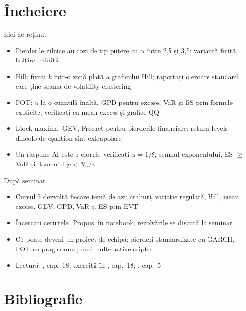 \section{Încheiere}

\begin{frame}{Idei de reținut}
\itemsize{\small}
\begin{itemize}
    \item Pierderile zilnice au cozi de tip putere cu $\alpha$ între 2,5 și 3,5: varianță finită, boltire infinită
    \item Hill: fixați $k$ într-o zonă plată a graficului Hill; raportați o eroare standard care ține seama de volatility clustering
    \item POT: $u$ la o cuantilă înaltă, GPD pentru excese, VaR și ES prin formule explicite; verificați cu mean excess și grafice QQ
    \item Block maxima: GEV, Fréchet pentru pierderile financiare; return levels dincolo de eșantion sînt extrapolare
    \item Un răspuns AI este o ciornă: verificați $\alpha = 1/\xi$, semnul exponentului, ES $\ge$ VaR și domeniul $p < N_u/n$
\end{itemize}
\end{frame}

\begin{frame}{După seminar}
\itemsize{\small}
\begin{itemize}
    \item Cursul 5 dezvoltă fiecare temă de azi: crahuri, variație regulată, Hill, mean excess, GEV, GPD, VaR și ES prin EVT
    \item Încercați cerințele [Propus] în notebook; rezolvările se discută la seminar
    \item C1 poate deveni un proiect de echipă: pierderi standardizate cu GARCH, POT cu prag comun, mai multe active cripto
    \item Lectură: , cap.~18; exerciții în , cap.~18; , cap.~5
\end{itemize}
\end{frame}


\section{Bibliografie}


